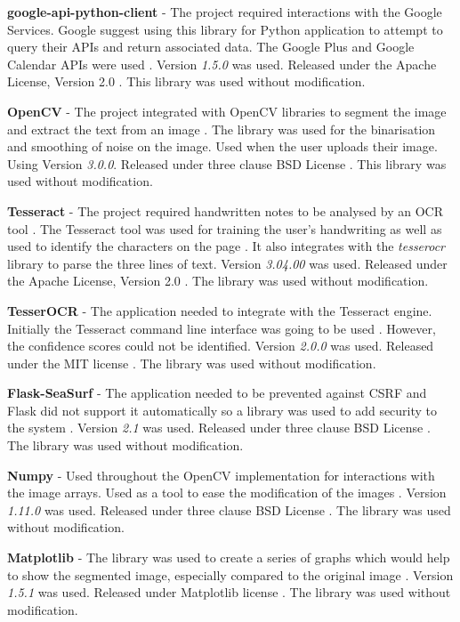 \textbf{google-api-python-client} - The project required interactions with the Google Services. Google suggest using this library for Python application to attempt to query their APIs and return associated data. The Google Plus and Google Calendar APIs were used \cite{citeulike:14025877}. Version \textit{1.5.0} was used. Released under the Apache License, Version 2.0 \cite{apache_license}.  This library was used without modification.

\textbf{OpenCV} - The project integrated with OpenCV libraries to segment the image and extract the text from an image \cite{citeulike:13206865}. The library was used for the binarisation and smoothing of noise on the image. Used when the user uploads their image. Using Version \textit{3.0.0}. Released under three clause BSD License \cite{citeulike:14025861}. This library was used without modification.

\textbf{Tesseract} - The project required handwritten notes to be analysed by an OCR tool . The Tesseract tool was used for training the user's handwriting as well as used to identify the characters on the page \cite{citeulike:14014368}. It also integrates with the \textit{tesserocr} library to parse the three lines of text. Version \textit{3.04.00} was used. Released under the Apache License, Version 2.0 \cite{apache_license}. The library was used without modification.

\textbf{TesserOCR} - The application needed to integrate with the Tesseract engine. Initially the Tesseract command line interface was going to be used \cite{citeulike:14021437}. However, the confidence scores could not be identified. Version \textit{2.0.0} was used. Released under the MIT license \cite{citeulike:14025880}. The library was used without modification.

\textbf{Flask-SeaSurf} - The application needed to be prevented against CSRF and Flask did not support it automatically so a library was used to add security to the system \cite{citeulike:14025881}. Version \textit{2.1} was used. Released under three clause BSD License \cite{citeulike:14025861}. The library was used without modification.

\textbf{Numpy} - Used throughout the OpenCV implementation for interactions with the image arrays. Used as a tool to ease the modification of the images \cite{citeulike:14025883}. Version \textit{1.11.0} was used. Released under three clause BSD License \cite{citeulike:14025861}. The library was used without modification.

\textbf{Matplotlib} - The library was used to create a series of graphs which would help to show the segmented image, especially compared to the original image \cite{Hunter:2007}. Version \textit{1.5.1} was used. Released under Matplotlib license \cite{citeulike:14025887}. The library was used without modification.

